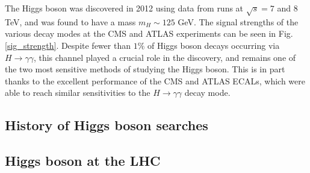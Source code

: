   The Higgs boson was discovered in 2012 using data from runs at $\sqrt{s}=7$ and $8$ TeV, and was found to have a mass $m_H \sim 125$ GeV. The signal strengths of the various decay modes at the CMS and ATLAS experiments can be seen in Fig. \ref{sig_strength}. Despite fewer than $1\%$ of Higgs boson decays occurring via $H \rightarrow \gamma \gamma$, this channel played a crucial role in the discovery, and remains one of the two most sensitive methods of studying the Higgs boson. This is in part thanks to the excellent performance of the CMS and ATLAS ECALs, which were able to reach similar sensitivities to the $H\rightarrow \gamma \gamma$ decay mode.

  \subsection{History of Higgs boson searches}
  \subsection{Higgs boson at the LHC}
